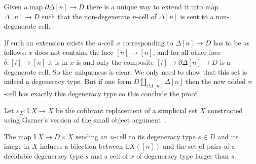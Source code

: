 \documentclass[reqno,10pt,a4paper,oneside]{amsart}
\makeatletter
\renewenvironment{proof}[1][\proofname] {\par\pushQED{\qed}\normalfont\topsep6\p@\@plus6\p@\relax\trivlist\item[\hskip\labelsep\bf#1\@addpunct{.}]\ignorespaces}{\popQED\endtrivlist\@endpefalse}
\numberwithin{equation}{section}
\theoremstyle{mythm}
\theoremstyle{mydef}
\theoremstyle{myrmk}
\newcommand{\co}{\colon}
\makeatother
\begin{document}
\begin{lemma} \label{lem:D_contractible}
Given a map $\partial \Delta[n] \rightarrow D$ there is a unique way to extend it into map $\Delta[n] \rightarrow D$ such that the non-degenerate $n$-cell of $\Delta[n]$ is sent to a non-degenerate cell.
\end{lemma}

\begin{proof}
If such an extension exists the $n$-cell $x$ corresponding to $\Delta[n] \rightarrow D$ has to be as follows: $x$ does not contains the face $[n] \rightarrow [n]$, and for all other face $\delta:[i] \rightarrow [n]$ it is in $x$ is and only the composite $[i] \rightarrow \partial \Delta[n] \rightarrow D$ is a degenerate cell. So the uniqueness is clear. We only need to show that this set is indeed a degeneracy type. But if one form $D \coprod_{\partial \Delta[n]} \Delta[n]$ then the new added $n$-cell has exactly this degeneracy type so this conclude the proof.
\end{proof}

Let $\varepsilon_X \co \mathbb{L} X \to X$ be the cofibrant replacement of a simplicial set $X$ constructed using  Garner's version of the small object argument~\cite{garner:small-object-argument}.

\begin{proposition} \label{prop:Cof_replacement}
The map $\mathbb{L} X \rightarrow D \times X$ sending an $n$-cell to its degeneracy type $s \in D$ and its image in $X$ induces a bijection between $\mathbb{L}X([n])$ and the set of pairs of a decidable degeneracy type $s$ and a cell of $x$ of degeneracy type larger than $s$.
\end{proposition}
\end{document}
